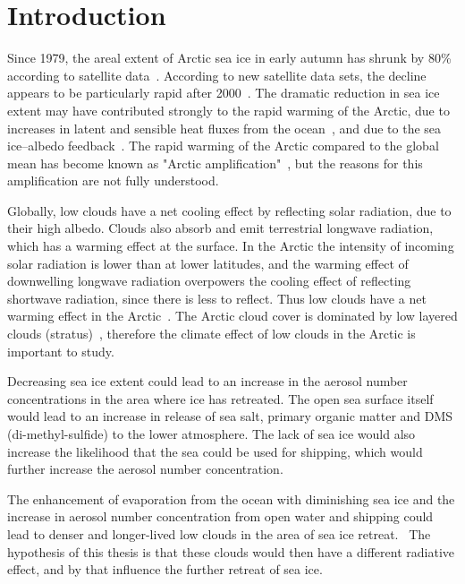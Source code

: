 \chapter{Introduction}
\label{chap:introduction}
Since 1979, the areal extent of Arctic sea ice in early autumn has shrunk by 80\% according to satellite data~\citep{NSIDC}. According to new satellite data sets, the decline appears to be particularly rapid after 2000~\citep{Wu2012}. The dramatic reduction in sea ice extent may have contributed strongly to the rapid warming of the Arctic, due to increases in latent and sensible heat fluxes from the ocean~\citep{Screen2010}, and due to the sea ice--albedo feedback~\citep{Curry1995a}. The rapid warming of the Arctic compared to the global mean has become known as "Arctic amplification"~\citep{Graversen2008}, but the reasons for this amplification are not fully understood.

Globally, low clouds have a net cooling effect by reflecting solar radiation, due to their high albedo. Clouds also absorb and emit terrestrial longwave radiation, which has a warming effect at the surface. In the Arctic the intensity of incoming solar radiation is lower than at lower latitudes, and the warming effect of downwelling longwave radiation overpowers the cooling effect of reflecting shortwave radiation, since there is less to reflect. Thus low clouds have a net warming effect in the Arctic~\citep{Shupe2004}. The Arctic cloud cover is dominated by low layered clouds (stratus)~\citep{Curry1996}, therefore the climate effect of low clouds in the Arctic is important to study.

Decreasing sea ice extent could lead to an increase in the aerosol number concentrations in the area where ice has retreated. The open sea surface itself would lead to an increase in release of sea salt, primary organic matter and DMS (di-methyl-sulfide) to the lower atmosphere. The lack of sea ice would also increase the likelihood that the sea could be used for shipping, which would further increase the aerosol number concentration.

The enhancement of evaporation from the ocean with diminishing sea ice and the increase in aerosol number concentration from open water and shipping could lead to denser and longer-lived low clouds in the area of sea ice retreat.~%
The  hypothesis of this thesis is that these clouds would then have a different radiative effect, and by that influence the further retreat of sea ice.


